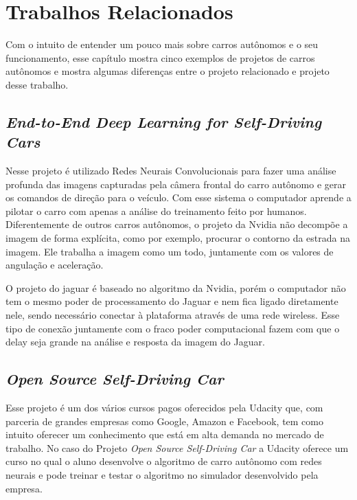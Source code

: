 \chapter{Trabalhos Relacionados}
\label{cap:trabalhos-relacionados}

Com o intuito de entender um pouco mais sobre carros autônomos e o seu funcionamento, esse capítulo mostra cinco exemplos de projetos de carros autônomos e mostra algumas diferenças entre o projeto relacionado e projeto desse trabalho.

\section{\textit{End-to-End Deep Learning for Self-Driving Cars}}

Nesse projeto é utilizado Redes Neurais Convolucionais para fazer uma análise profunda das imagens capturadas pela câmera frontal do carro autônomo e gerar os comandos de direção para o veículo. Com esse sistema o computador aprende a pilotar o carro com apenas a análise do treinamento feito por humanos. Diferentemente de outros carros autônomos, o projeto da Nvidia não decompõe a imagem de forma explícita, como por exemplo, procurar o contorno da estrada na imagem. Ele trabalha a imagem como um todo, juntamente com os valores de angulação e aceleração. \cite{nvidiabojarski2016end}

O projeto do jaguar é baseado no algoritmo da Nvidia, porém o computador não tem o mesmo poder de processamento do Jaguar e nem fica ligado diretamente nele, sendo necessário conectar à plataforma através de uma rede wireless. Esse tipo de conexão juntamente com o fraco poder computacional fazem com que o delay seja grande na análise e resposta da imagem do Jaguar.

\section{\textit{Open Source Self-Driving Car}}

Esse projeto é um dos vários cursos pagos oferecidos pela Udacity que, com parceria de grandes empresas como Google, Amazon e Facebook, tem como intuito oferecer um conhecimento que está em alta demanda no mercado de trabalho. No caso do Projeto \textit{Open Source Self-Driving Car} a Udacity oferece um curso no qual o aluno desenvolve o algoritmo de carro autônomo com redes neurais e pode treinar e testar o algoritmo no simulador desenvolvido pela empresa. \cite{self-drivingcar} 

